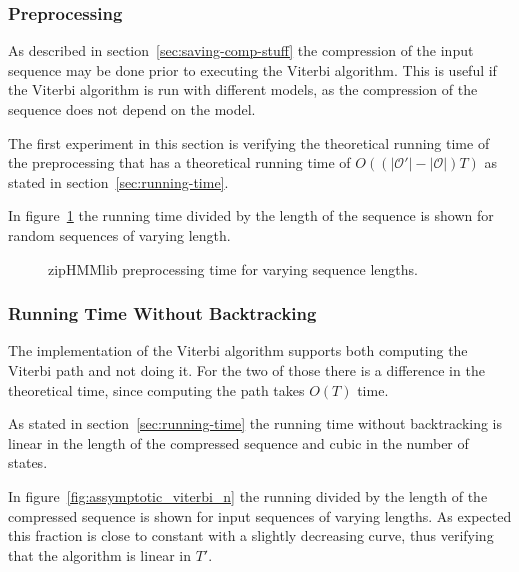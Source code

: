 \subsubsection{Preprocessing}

As described in section~\ref{sec:saving-comp-stuff} the compression of the
input sequence may be done prior to executing the Viterbi algorithm. This is
useful if the Viterbi algorithm is run with different models, as the
compression of the sequence does not depend on the model.

The first experiment in this section is verifying the theoretical running time
of the preprocessing that has a theoretical running time of
$O( \left( \lvert\mathcal{O'}\rvert - \lvert{\mathcal{O}}\rvert \right) T)$ as
stated in section~\ref{sec:running-time}.

In figure~\ref{fig:pre_viterbi_n} the running time divided by the length of the
sequence is shown for random sequences of varying length. 

\begin{figure}
  \centering
  
  \caption{zipHMMlib preprocessing time for varying sequence lengths.}
  \label{fig:pre_viterbi_n}
\end{figure}

%   

\subsubsection{Running Time Without Backtracking}

The implementation of the Viterbi algorithm supports both computing the Viterbi
path and not doing it. For the two of those there is a difference in the
theoretical time, since computing the path takes $O(T)$ time.

As stated in section~\ref{sec:running-time} the running time without
backtracking is linear in the length of the compressed sequence and cubic in
the number of states.

In figure~\ref{fig:assymptotic_viterbi_n} the running divided by the length of
the compressed sequence is shown for input sequences of varying lengths. As
expected this fraction is close to constant with a slightly decreasing curve,
thus verifying that the algorithm is linear in $T'$.

